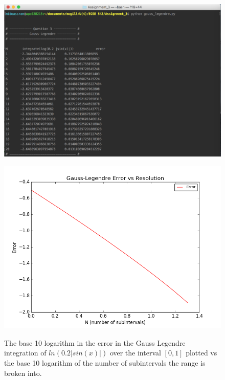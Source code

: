 \documentclass[11pt]{article}
\begin{document}
\begin{figure}[!hbp]
	\begin{center}
		\begin{minipage}{ 0.7\textwidth}
			\includegraphics[width= \textwidth]{o_GL_log_sin.png}\\
		\end{minipage}
		\begin{minipage}{ \textwidth}
			\includegraphics[width=\textwidth]{GL_log_sin}\\
		\end{minipage}
		\caption{\label{fig:GL_log_sin}The base 10 logarithm in the error in the Gauss Legendre integration of $ln(0.2 |sin(x)|)$ over the interval $[0,1]$ plotted vs the base 10 logarithm of the number of subintervals the range is broken into.}
	\end{center}
\end{figure}
\end{document}
